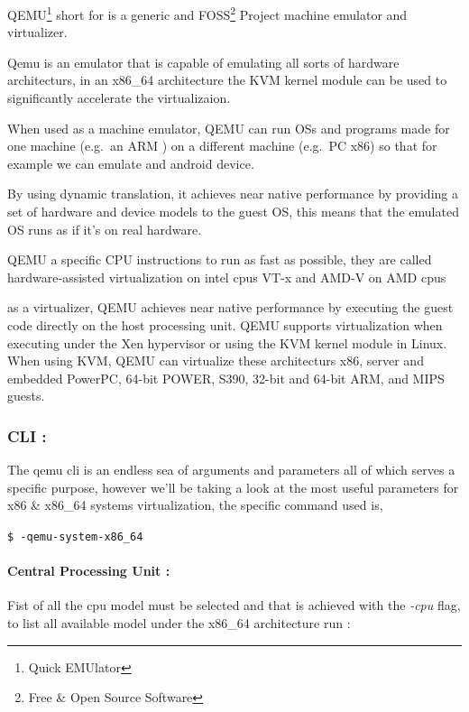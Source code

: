\documentclass[
  14pt,
  english,
  a4paper,
]{scrreprt}
\begin{document}
QEMU\footnote{Quick EMUlator} short for is a generic and FOSS\footnote{Free
  \& Open Source Software} Project machine emulator and virtualizer.

Qemu is an emulator that is capable of emulating all sorts of hardware
architecturs, in an x86\_64 architecture the KVM kernel module can be
used to significantly accelerate the virtualizaion.

When used as a machine emulator, QEMU can run OSs and programs made for
one machine (e.g.~an ARM ) on a different machine (e.g.~PC x86) so that
for example we can emulate and android device.

By using dynamic translation, it achieves near native performance by
providing a set of hardware and device models to the guest OS, this
means that the emulated OS runs as if it's on real hardware.

QEMU a specific CPU instructions to run as fast as possible, they are
called hardware-assisted virtualization on intel cpus VT-x and AMD-V on
AMD cpus

as a virtualizer, QEMU achieves near native performance by executing the
guest code directly on the host processing unit. QEMU supports
virtualization when executing under the Xen hypervisor or using the KVM
kernel module in Linux. When using KVM, QEMU can virtualize these
architecturs x86, server and embedded PowerPC, 64-bit POWER, S390,
32-bit and 64-bit ARM, and MIPS guests.

\hypertarget{cli-1}{%
\subsubsection{CLI :}\label{cli-1}}

The qemu cli is an endless sea of arguments and parameters all of which
serves a specific purpose, however we'll be taking a look at the most
useful parameters for x86 \& x86\_64 systems virtualization, the
specific command used is,

\texttt{\$\ -qemu-system-x86\_64}

\hypertarget{central-processing-unit}{%
\paragraph*{Central Processing Unit :}\label{central-processing-unit}}

Fist of all the cpu model must be selected and that is achieved with the
\emph{-cpu} flag, to list all available model under the x86\_64
architecture run :
\end{document}
